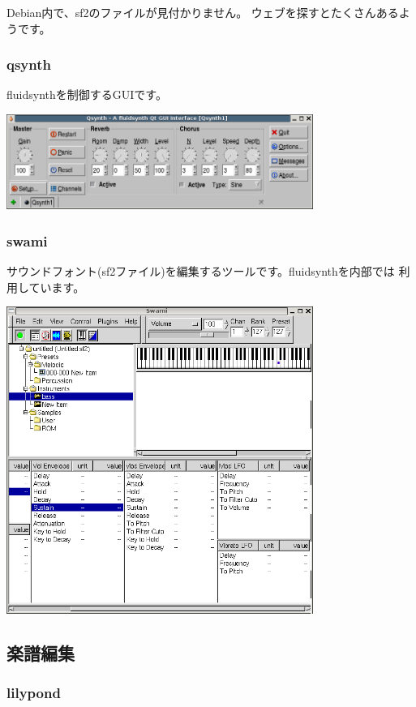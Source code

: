 \documentclass[mingoth,a4paper]{jsarticle}
\begin{document}
Debian内で、sf2のファイルが見付かりません。
ウェブを探すとたくさんあるようです。

\subsubsection{qsynth}

fluidsynthを制御するGUIです。

\includegraphics[width=10cm]{image200602/qsynth.png}

\subsubsection{swami}

サウンドフォント(sf2ファイル)を編集するツールです。fluidsynthを内部では
利用しています。

\includegraphics[width=10cm]{image200602/swami.png}

\subsection{楽譜編集}
\subsubsection{lilypond}
\end{document}
